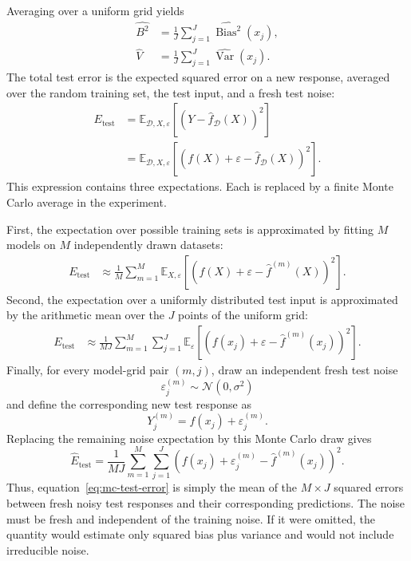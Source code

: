 \documentclass[11pt,a4paper]{article}
\begin{document}
Averaging over a uniform grid yields
\begin{align}
  \widehat{B^2}&=\frac{1}{J}\sum_{j=1}^{J}
      \widehat{\operatorname{Bias}^2}(x_j),\\
  \widehat V&=\frac{1}{J}\sum_{j=1}^{J}
      \widehat{\operatorname{Var}}(x_j).
\end{align}
The total test error is the expected squared error on a new response, averaged over the random training set, the test input, and a fresh test noise:
\begin{align*}
  E_{\mathrm{test}}
  &=\mathbb E_{\mathcal D,X,\varepsilon}
    \left[\left(Y-\widehat f_{\mathcal D}(X)\right)^2\right]\\
  &=\mathbb E_{\mathcal D,X,\varepsilon}
    \left[\left(f(X)+\varepsilon-
    \widehat f_{\mathcal D}(X)\right)^2\right].
\end{align*}
This expression contains three expectations. Each is replaced by a finite Monte Carlo average in the experiment.

First, the expectation over possible training sets is approximated by fitting $M$ models on $M$ independently drawn datasets:
\begin{align*}
  E_{\mathrm{test}}
  &\approx \frac{1}{M}\sum_{m=1}^{M}
  \mathbb E_{X,\varepsilon}
  \left[\left(f(X)+\varepsilon-
  \widehat f^{(m)}(X)\right)^2\right].
\end{align*}
Second, the expectation over a uniformly distributed test input is approximated by the arithmetic mean over the $J$ points of the uniform grid:
\begin{align*}
  E_{\mathrm{test}}
  &\approx \frac{1}{MJ}\sum_{m=1}^{M}\sum_{j=1}^{J}
  \mathbb E_{\varepsilon}
  \left[\left(f(x_j)+\varepsilon-
  \widehat f^{(m)}(x_j)\right)^2\right].
\end{align*}
Finally, for every model-grid pair $(m,j)$, draw an independent fresh test noise
\[
  \varepsilon_j^{(m)}\sim\mathcal N(0,\sigma^2)
\]
and define the corresponding new test response as
\[
  Y_j^{(m)}=f(x_j)+\varepsilon_j^{(m)}.
\]
Replacing the remaining noise expectation by this Monte Carlo draw gives
\begin{equation}
  \widehat E_{\mathrm{test}}
  =\frac{1}{MJ}\sum_{m=1}^{M}\sum_{j=1}^{J}
  \left(f(x_j)+\varepsilon_j^{(m)}-\widehat f^{(m)}(x_j)\right)^2.
  \label{eq:mc-test-error}
\end{equation}
Thus, equation~\eqref{eq:mc-test-error} is simply the mean of the $M\times J$ squared errors between fresh noisy test responses and their corresponding predictions. The noise must be fresh and independent of the training noise. If it were omitted, the quantity would estimate only squared bias plus variance and would not include irreducible noise.
\end{document}
